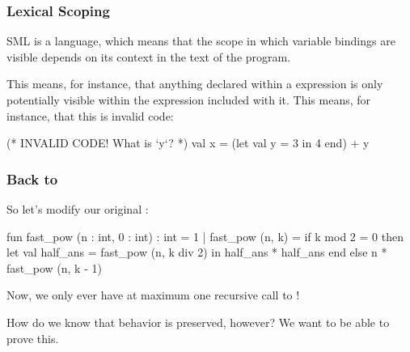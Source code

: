\documentclass[aspectratio=169]{beamer}
\begin{document}
\begin{frame}[fragile]
  \frametitle{Lexical Scoping}

  SML is a  language, which means that the scope in which
  variable bindings are visible depends on its context in the text of the program.
  
  \pause
  \vspace{\fill}

  This means, for instance, that anything declared within a  expression
  is only potentially visible within the expression included with it. This means,
  for instance, that this is invalid code: 

  \begin{codeblock}
    (* INVALID CODE! What is `y`? *)
    val x = 
      (let 
        val y = 3
      in 
        4 
      end) + y 
  \end{codeblock}
\end{frame}

\begin{frame}[fragile]
  \frametitle{Back to }

  So let's modify our original :

  \pause

  { \small
  \begin{codeblock}
    fun fast_pow (n : int, 0 : int) : int = 1
      | fast_pow (n, k) =
          if k mod 2 = 0 then 
            let
              val half_ans = fast_pow (n, k div 2)
            in
              half_ans * half_ans 
            end
          else
            n * fast_pow (n, k - 1) 
  \end{codeblock}
  }

  Now, we only ever have at maximum one recursive call to !

  \pause
  \vspace{\fill}

  How do we know that behavior is preserved, however? We want to be able to
  prove this.
\end{frame}
\end{document}
